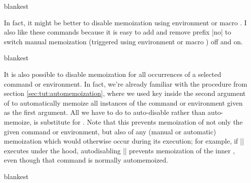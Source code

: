 \documentclass[a4paper,11pt]{article}
\begin{document}
\begin{tcboxedraster}[raster columns=2, raster equal height=rows]{blankest}
\end{tcboxedraster}

In fact, it might be better to disable memoization using environment
 or macro .  I also like these
commands because it is easy to add and remove prefix |no| to switch manual
memoization (triggered using environment  or macro
) off and on.

\begin{tcboxedraster}[raster columns=2, raster equal height=rows]{blankest}
\end{tcboxedraster}

It is also possible to disable memoization for all occurrences of a selected
command or environment.  In fact, we're already familiar with the procedure
from section \ref{sec:tut:automemoization}, where we used key
 inside the second argument of  to
automatically memoize all instances of the command or environment given as the
first argument.  All we have to do to auto-disable rather than auto-memoize, is
substitute  for .  Note that this
prevents memoization of not only the given command or environment, but also of
any (manual or automatic) memoization which would otherwise occur during its
execution; for example, if |\foo| executes  under the hood,
autodisabling |\foo| prevents memoization of the inner , even though
that command is normally automemoized.

\begin{tcboxedraster}[raster columns=2, raster equal height=rows]{blankest}
\end{tcboxedraster}
\end{document}
